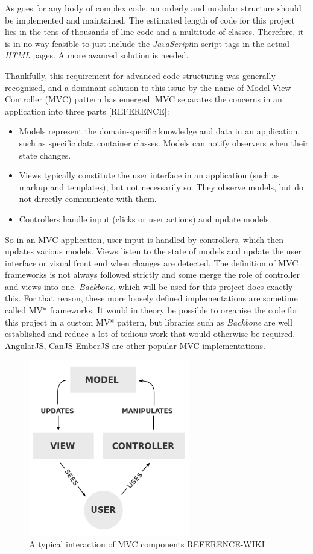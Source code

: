 \documentclass[a4paper,11pt,twoside]{article}
\begin{document}
As goes for any body of complex code, an orderly and modular structure should be implemented and maintained. The estimated length of code for this project lies in the tens of thousands of line code and a multitude of classes. Therefore, it is in no way feasible to just include the \textit{JavaScript}in script tags in the actual \textit{HTML} pages. A more avanced solution is needed.

Thankfully, this requirement for advanced code structuring was generally recognised, and a dominant solution to this issue by the name of Model View Controller (MVC) pattern has emerged. MVC separates the concerns in an application into three parts [REFERENCE]:

\begin{itemize}
\item Models represent the domain-specific knowledge and data in an application, such as specific data container classes. Models can notify observers when their state changes.
\item Views typically constitute the user interface in an application (such as markup and templates), but not necessarily so. They observe models, but do not directly communicate with them.
\item Controllers handle input (clicks or user actions) and update models.
\end{itemize}

So in an MVC application, user input is handled by controllers, which then updates various models. Views listen to the state of models and update the user interface or visual front end when changes are detected. The definition of MVC frameworks is not always followed strictly and some merge the role of controller and views into one. \textit{Backbone}, which will be used for this project does exactly this. For that reason, these more loosely defined implementations are sometime called MV* frameworks. It would in theory be possible to organise the code for this project in a custom MV* pattern, but libraries such as \textit{Backbone} are well established and reduce a lot of tedious work that would otherwise be required. AngularJS, CanJS EmberJS are other popular MVC implementations.

\begin{figure}[ht!]
\centering
\includegraphics[width=70mm]{graphics/MVC_01.png}
\caption{A typical interaction of MVC components REFERENCE-WIKI}
\label{fig:UIdesign1}
\end{figure}
\end{document}

